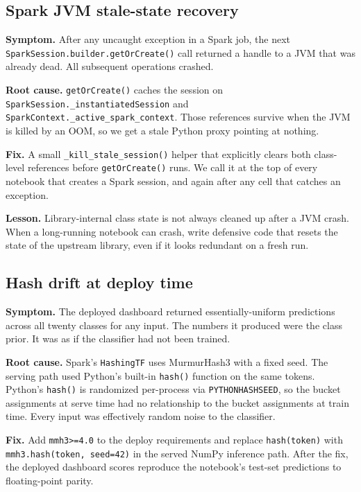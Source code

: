 \documentclass[11pt,letterpaper]{article}
\begin{document}
\subsection{Spark JVM stale-state recovery}

\textbf{Symptom.} After any uncaught exception in a Spark job, the next \texttt{SparkSession.builder.getOrCreate()} call returned a handle to a JVM that was already dead. All subsequent operations crashed.

\textbf{Root cause.} \texttt{getOrCreate()} caches the session on \texttt{SparkSession.\_instantiatedSession} and \texttt{SparkContext.\_active\_spark\_context}. Those references survive when the JVM is killed by an OOM, so we get a stale Python proxy pointing at nothing.

\textbf{Fix.} A small \texttt{\_kill\_stale\_session()} helper that explicitly clears both class-level references before \texttt{getOrCreate()} runs. We call it at the top of every notebook that creates a Spark session, and again after any cell that catches an exception.

\textbf{Lesson.} Library-internal class state is not always cleaned up after a JVM crash. When a long-running notebook can crash, write defensive code that resets the state of the upstream library, even if it looks redundant on a fresh run.

\subsection{Hash drift at deploy time}

\textbf{Symptom.} The deployed dashboard returned essentially-uniform predictions across all twenty classes for any input. The numbers it produced were the class prior. It was as if the classifier had not been trained.

\textbf{Root cause.} Spark's \texttt{HashingTF} uses MurmurHash3 with a fixed seed. The serving path used Python's built-in \texttt{hash()} function on the same tokens. Python's \texttt{hash()} is randomized per-process via \texttt{PYTHONHASH\-SEED}, so the bucket assignments at serve time had no relationship to the bucket assignments at train time. Every input was effectively random noise to the classifier.

\textbf{Fix.} Add \texttt{mmh3>=4.0} to the deploy requirements and replace \texttt{hash(token)} with \texttt{mmh3.hash(token, seed=42)} in the served NumPy inference path. After the fix, the deployed dashboard scores reproduce the notebook's test-set predictions to floating-point parity.
\end{document}
